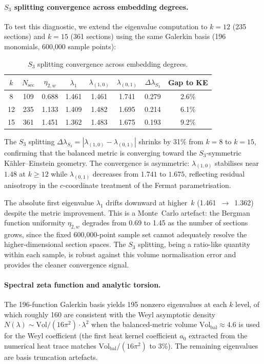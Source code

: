 \paragraph{$S_3$ splitting convergence across embedding degrees.}
\label{sec:4-s3-convergence}
To test this diagnostic, we extend the eigenvalue computation to $k = 12$ (235 sections) and $k = 15$ (361 sections) using the same Galerkin basis (196 monomials, 600{,}000 sample points):
\begin{table}[htbp]
\centering
\caption{$S_3$ splitting convergence across embedding degrees.}
\label{tab:4-s3-convergence}
\small
\begin{tabular}{@{}cccccccc@{}}
\toprule
$k$ & $N_{\text{sec}}$ & $\eta_{2,w}$ & $\lambda_1$ & $\lambda_{(1,0)}$ & $\lambda_{(0,1)}$ & $\Delta\lambda_{S_3}$ & Gap to KE \\
\midrule
8 & 109 & 0.688 & 1.461 & 1.461 & 1.741 & 0.279 & 2.6\% \\
12 & 235 & 1.133 & 1.409 & 1.482 & 1.695 & 0.214 & 6.1\% \\
15 & 361 & 1.451 & 1.362 & 1.483 & 1.675 & 0.193 & 9.2\% \\
\bottomrule
\end{tabular}
\end{table}
The $S_3$ splitting $\Delta\lambda_{S_3} = |\lambda_{(1,0)} - \lambda_{(0,1)}|$ shrinks by 31\% from $k = 8$ to $k = 15$, confirming that the balanced metric is converging toward the $S_3$-symmetric K\"ahler--Einstein geometry.  The convergence is asymmetric: $\lambda_{(1,0)}$ stabilises near $1.48$ at $k \geq 12$ while $\lambda_{(0,1)}$ decreases from $1.741$ to $1.675$, reflecting residual anisotropy in the $c$-coordinate treatment of the Fermat parametrisation.

The absolute first eigenvalue $\lambda_1$ drifts downward at higher~$k$ (1.461~$\to$~1.362) despite the metric improvement.  This is a Monte~Carlo artefact: the Bergman function uniformity $\eta_{2,w}$ degrades from 0.69 to 1.45 as the number of sections grows, since the fixed 600{,}000-point sample set cannot adequately resolve the higher-dimensional section spaces.  The $S_3$ splitting, being a ratio-like quantity within each sample, is robust against this volume normalisation error and provides the cleaner convergence signal.

\paragraph{Spectral zeta function and analytic torsion.}
\label{sec:4-torsion-assessment}
The 196-function Galerkin basis yields 195 nonzero eigenvalues at each $k$ level, of which roughly 160 are consistent with the Weyl asymptotic density $N(\lambda) \sim \mathrm{Vol}/(16\pi^2) \cdot \lambda^2$ when the balanced-metric volume $\mathrm{Vol}_{\text{bal}} \approx 4.6$ is used for the Weyl coefficient (the first heat kernel coefficient $a_0$ extracted from the numerical heat trace matches $\mathrm{Vol}_{\text{bal}}/(16\pi^2)$ to 3\%).  The remaining eigenvalues are basis truncation artefacts.

